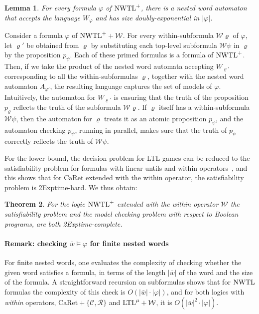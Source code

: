 \documentclass{LMCS}
\newcommand{\M}{{\mu}}
\newcommand{\w}{{\bar{w}}}
\newcommand{\C}{{\mathcal{C}}}
\newcommand{\R}{{\mathcal{R}}}
\newcommand{\WW}{{\mathcal{W}}}
\renewcommand{\phi}{\varphi}
\theoremstyle{plain}
\newtheorem{theorem}{Theorem}[section]
\newtheorem{lemma}[theorem]{Lemma}
\theoremstyle{definition}
\newcommand{\EXPTIME}{{\sc Exptime}}
\newcommand{\caret}{\text{CaRet}}
\newcommand{\ltlv}{\text{\rm LTL}^\M}
\newcommand{\nwtlp}{\nwtl^+}
\begin{document}
\begin{lemma}
For every formula $\varphi$ of $\nwtlp$, there is a nested word automaton
that accepts the language $W_\varphi$ and has size doubly-exponential
in $|\varphi|$.
\end{lemma}


Consider a formula $\varphi$ of $\nwtlp+\WW$.
For every within-subformula $\WW\varrho$ of
$\varphi$,   
let $\varrho'$ be obtained from $\varrho$ by
substituting each top-level subformula $\WW\psi$ in $\varrho$ by the
proposition $p_\psi$.  
Each of these primed
formulas is a formula of $\nwtlp$.  Then, if we take the product of the
nested word automata accepting $W_{\varrho'}$ corresponding to all the
within-subformulas $\varrho$, together with the nested word automaton
$A_{\varphi'}$, the resulting language captures the set of
models of $\varphi$.  Intuitively, the automaton for $W_{\varrho'}$ is
ensuring that the truth of the proposition $p_\varrho$ reflects the truth
of the subformula $\WW\varrho$.  If $\varrho$ itself has a within-subformula
$\WW\psi$, then the automaton for $\varrho$ treats it as an
atomic proposition $p_\psi$, and the automaton checking $p_\psi$,
running in parallel, makes sure that the truth of $p_\psi$ correctly
reflects the truth of $\WW\psi$.

For the lower bound, the decision problem for LTL games can be reduced 
to the satisfiability problem for formulas with linear untils and within
operators~\cite{Madhu04}, and this shows that
for $\caret$  extended with the within operator,
the satisfiability problem is 2\EXPTIME-hard.
We thus obtain:
\begin{theorem}
For the logic $\nwtlp$ extended with the within operator $\WW$
the satisfiability problem and the model checking problem with respect to
Boolean programs, are both 2\EXPTIME-complete.
\end{theorem}

\paragraph{Remark: checking $\w\models\varphi$ for finite nested words} For finite
nested words, one evaluates the 
complexity of checking whether the given word satisfies a formula,
 in terms of the length $|\w|$ of the word and the size of the formula. 
A straightforward recursion on
subformulas shows that for $\text{\rm NWTL}$ formulas the complexity of
this check is $O(|\w|\cdot|\phi|)$, and for both logics with
{\em within} operators, $\caret+\{\C,\R\}$ and $\ltlv+\WW$, it is 
$O(|\w|^2\cdot|\phi|)$. 
\end{document}
